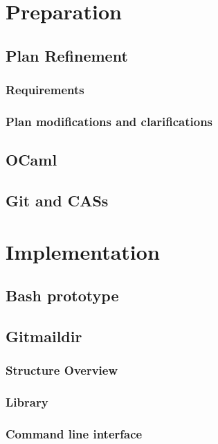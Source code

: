 \documentclass[12pt,a4paper,twoside,openright]{report}
\begin{document}
\chapter{Preparation}

\section{Plan Refinement}

\subsection{Requirements}

\subsection{Plan modifications and clarifications}

\section{OCaml}

\section{Git and CASs}

\chapter{Implementation}

\section{Bash prototype}

\section{Gitmaildir}

\subsection{Structure Overview}

\subsection{Library}

\subsection{Command line interface}
\end{document}
